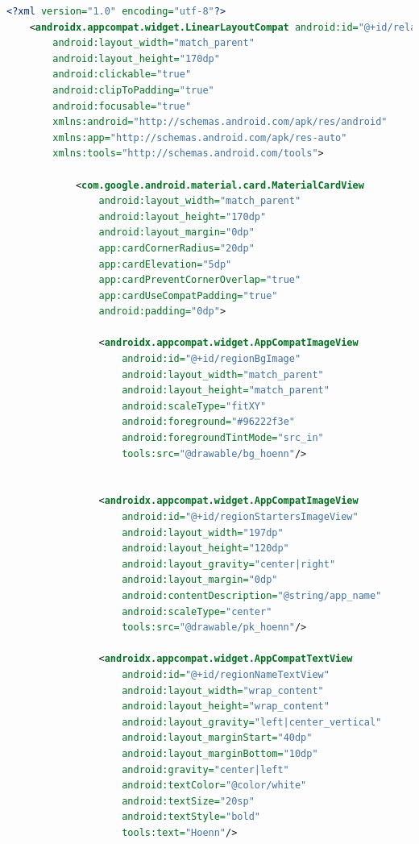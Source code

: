 \documentclass[a4paper, 12pt]{article}
\begin{document}
\begin{lstlisting}[caption={Region Item Layout.}, label={code:screen_item_region}, language=XML]
    <?xml version="1.0" encoding="utf-8"?>
    <androidx.appcompat.widget.LinearLayoutCompat android:id="@+id/relativeLayoutBackground"
        android:layout_width="match_parent"
        android:layout_height="170dp"
        android:clickable="true"
        android:clipToPadding="true"
        android:focusable="true"
        xmlns:android="http://schemas.android.com/apk/res/android"
        xmlns:app="http://schemas.android.com/apk/res-auto"
        xmlns:tools="http://schemas.android.com/tools">
    
            <com.google.android.material.card.MaterialCardView
                android:layout_width="match_parent"
                android:layout_height="170dp"
                android:layout_margin="0dp"
                app:cardCornerRadius="20dp"
                app:cardElevation="5dp"
                app:cardPreventCornerOverlap="true"
                app:cardUseCompatPadding="true"
                android:padding="0dp">
    
                <androidx.appcompat.widget.AppCompatImageView
                    android:id="@+id/regionBgImage"
                    android:layout_width="match_parent"
                    android:layout_height="match_parent"
                    android:scaleType="fitXY"
                    android:foreground="#96222f3e"
                    android:foregroundTintMode="src_in"
                    tools:src="@drawable/bg_hoenn"/>
    
    
                <androidx.appcompat.widget.AppCompatImageView
                    android:id="@+id/regionStartersImageView"
                    android:layout_width="197dp"
                    android:layout_height="120dp"
                    android:layout_gravity="center|right"
                    android:layout_margin="0dp"
                    android:contentDescription="@string/app_name"
                    android:scaleType="center"
                    tools:src="@drawable/pk_hoenn"/>
    
                <androidx.appcompat.widget.AppCompatTextView
                    android:id="@+id/regionNameTextView"
                    android:layout_width="wrap_content"
                    android:layout_height="wrap_content"
                    android:layout_gravity="left|center_vertical"
                    android:layout_marginStart="40dp"
                    android:layout_marginBottom="10dp"
                    android:gravity="center|left"
                    android:textColor="@color/white"
                    android:textSize="20sp"
                    android:textStyle="bold"
                    tools:text="Hoenn"/>
    

\end{lstlisting}
\end{document}
